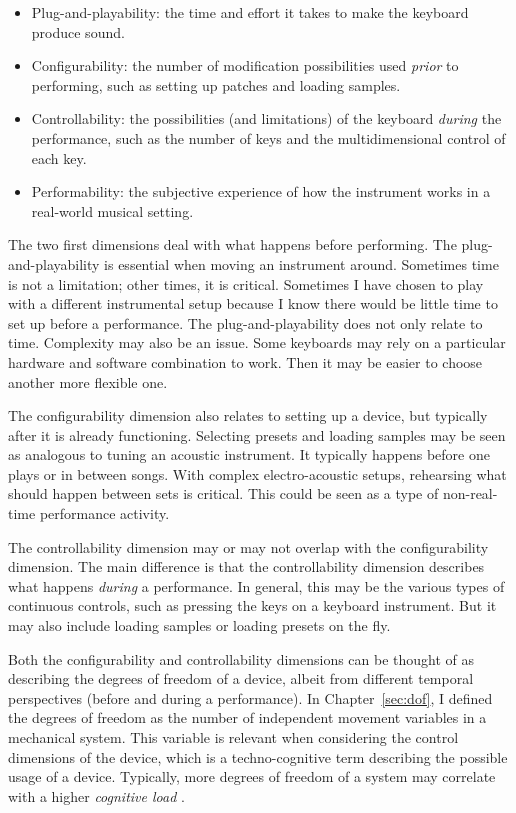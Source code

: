 \begin{itemize}
	\item Plug-and-playability: the time and effort it takes to make the keyboard produce sound.

	\item Configurability: the number of modification possibilities used \emph{prior} to performing, such as setting up patches and loading samples.

	\item Controllability: the possibilities (and limitations) of the keyboard \emph{during} the performance, such as the number of keys and the multidimensional control of each key.

	\item Performability: the subjective experience of how the instrument works in a real-world musical setting.
\end{itemize}

The two first dimensions deal with what happens before performing. The plug-and-playability is essential when moving an instrument around. Sometimes time is not a limitation; other times, it is critical. Sometimes I have chosen to play with a different instrumental setup because I know there would be little time to set up before a performance. The plug-and-playability does not only relate to time. Complexity may also be an issue. Some keyboards may rely on a particular hardware and software combination to work. Then it may be easier to choose another more flexible one.

The configurability dimension also relates to setting up a device, but typically after it is already functioning. Selecting presets and loading samples may be seen as analogous to tuning an acoustic instrument. It typically happens before one plays or in between songs. With complex electro-acoustic setups, rehearsing what should happen between sets is critical. This could be seen as a type of non-real-time performance activity.

The controllability dimension may or may not overlap with the configurability dimension. The main difference is that the controllability dimension describes what happens \emph{during} a performance. In general, this may be the various types of continuous controls, such as pressing the keys on a keyboard instrument. But it may also include loading samples or loading presets on the fly.

Both the configurability and controllability dimensions can be thought of as describing the degrees of freedom of a device, albeit from different temporal perspectives (before and during a performance). In Chapter~\ref{sec:dof}, I defined the degrees of freedom as the number of independent movement variables in a mechanical system. This variable is relevant when considering the control dimensions of the device, which is a techno-cognitive term describing the possible usage of a device. Typically, more degrees of freedom of a system may correlate with a higher \emph{cognitive load} \citep{sweller_cognitive_1994}.

